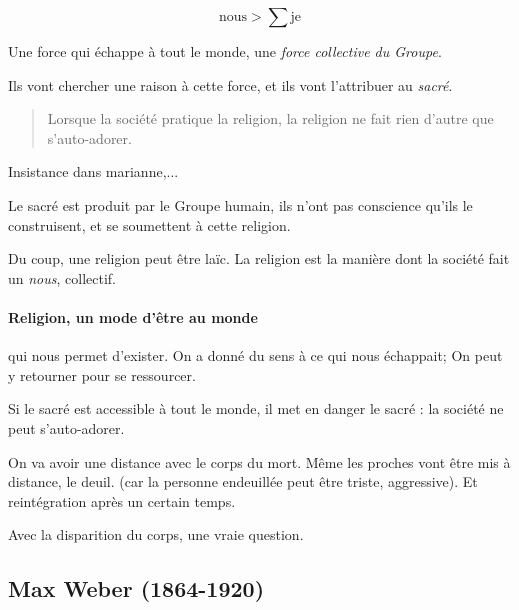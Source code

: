 \begin{equation}
    \text{nous} > \sum    \text{je} 
\end{equation}
 
 \begin{Def}
      Une force qui échappe à tout le monde, une \textit{force collective du Groupe}.
 \end{Def}
 Ils vont chercher une raison à cette force, et ils vont l'attribuer au \textit{sacré}.
 \begin{quote}
      Lorsque la société pratique la religion, la religion ne fait rien d'autre que s'auto-adorer.
 \end{quote}

 \begin{Ex}
     Insistance dans marianne,...
 \end{Ex}

 Le sacré est produit par le Groupe humain, ils n'ont pas conscience qu'ils le construisent, et se soumettent à cette religion.

 Du coup, une religion peut être laïc. La religion est la manière dont la société fait un \textit{nous}, collectif. 

\paragraph{Religion, un mode d'être au monde} qui nous permet d'exister. On a donné du sens à ce qui nous échappait; On peut y retourner pour se ressourcer.

Si le sacré est accessible à tout le monde, il met en danger le sacré : la société ne peut s'auto-adorer.


\begin{Ex}
On va avoir une distance avec le corps du mort.
Même les proches vont être mis à distance, le deuil. (car la personne endeuillée peut être triste, aggressive).  
Et reintégration après un certain temps. 
    
\end{Ex}


\begin{Ex}
Avec la disparition du corps, une vraie question.     
\end{Ex}



 \subsection{Max Weber (1864-1920) }

